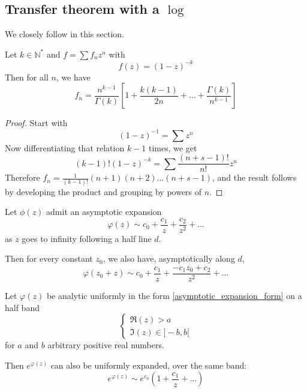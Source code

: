 \documentclass[../main.tex]{subfiles}
\begin{document}
\subsection{Transfer theorem with a $\log$}

We closely follow \cite{Jungen1931} in this section.

\begin{prop}{}
	Let $k \in \mathbb{N}^*$ and $f = \sum f_n z^n$ with
	$$
	f(z) = {(1 - z)}^{-k}
	$$
	Then for all $n$, we have
	$$
	f_n = \frac{n^{k - 1}}{\Gamma(k)} \left[1 + \frac{k(k-1)}{2n} + \dots + \frac{\Gamma(k)}{n^{k-1}}\right]
	$$
\end{prop}
\begin{proof}
	Start with
	$${(1 - z)}^{-1} = \sum z^n$$
	Now differentiating that relation $k - 1$ times, we get
	$$
	(k-1)! {(1-z)}^{-k} = \sum \frac{(n + s -1)!}{n!}z^n
	$$
	Therefore $f_n = \frac{1}{(k-1)!} (n+1)(n+2)\dots(n+s-1)$, and the result follows by developing the product and grouping by powers of $n$.
\end{proof}

\begin{lemma}{}\label{jungen_lemma_1}
	Let $\phi(z)$ admit an asymptotic expansion
	\begin{equation}\label{asymptotic_expansion_form}
	\varphi(z) \sim c_0 + \frac{c_1}{z} + \frac{c_2}{z^2} + \dots
	\end{equation}
	as $z$ goes to infinity following a half line $d$.
	
	Then for every constant $z_0$, we also have, asymptotically along $d$,
	\[
	\varphi(z_0 + z) \sim c_0 + \frac{c_1}{z} + \frac{-c_1 z_0 + c_2}{z^2} + \dots
	\]
\end{lemma}

\begin{lemma}{}\label{jungen_lemma_2}
	Let $\varphi(z)$ be analytic uniformly in the form \eqref{asymptotic_expansion_form} on a half band
	\begin{equation}\label{band_form}
	\begin{cases}
		\Re(z) > a\\
		\Im(z) \in ]-b, b[
	\end{cases}
	\end{equation}
	for $a$ and $b$ arbitrary positive real numbers.
	
	Then $e^{\varphi(z)}$ can also be uniformly expanded, over the same band:
	\[
	e^{\varphi(z)} \sim e^{c_0} \left(1 + \frac{c_1}{z} + \dots\right)
	\]
\end{lemma}
\end{document}
